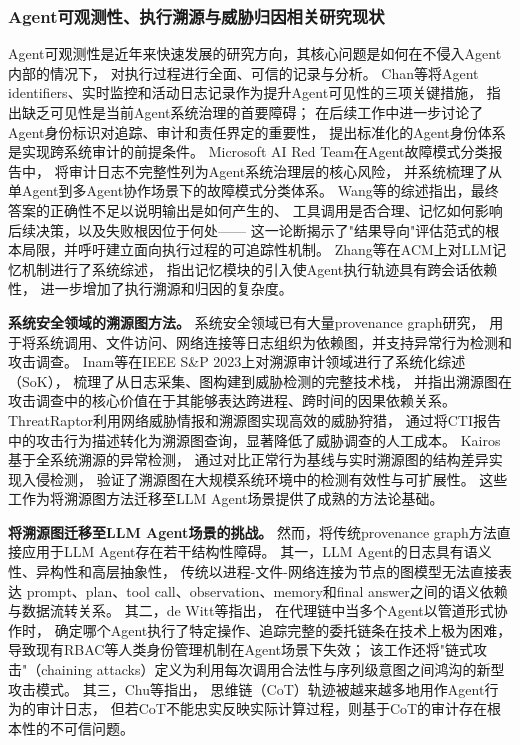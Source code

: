 \subsubsection{Agent可观测性、执行溯源与威胁归因相关研究现状}

Agent可观测性是近年来快速发展的研究方向，其核心问题是如何在不侵入Agent内部的情况下，
对执行过程进行全面、可信的记录与分析。
Chan等\cite{chan2024visibility}将Agent identifiers、实时监控和活动日志记录作为提升Agent可见性的三项关键措施，
指出缺乏可见性是当前Agent系统治理的首要障碍；
在后续工作\cite{chan2024ids}中进一步讨论了Agent身份标识对追踪、审计和责任界定的重要性，
提出标准化的Agent身份体系是实现跨系统审计的前提条件。
Microsoft AI Red Team\cite{microsoft2025taxonomy}在Agent故障模式分类报告中，
将审计日志不完整性列为Agent系统治理层的核心风险，
并系统梳理了从单Agent到多Agent协作场景下的故障模式分类体系。
Wang等\cite{wang2026traces}的综述指出，最终答案的正确性不足以说明输出是如何产生的、
工具调用是否合理、记忆如何影响后续决策，以及失败根因位于何处——
这一论断揭示了"结果导向"评估范式的根本局限，并呼吁建立面向执行过程的可追踪性机制。
Zhang等\cite{zhang2025survey}在ACM上对LLM记忆机制进行了系统综述，
指出记忆模块的引入使Agent执行轨迹具有跨会话依赖性，
进一步增加了执行溯源和归因的复杂度。

\textbf{系统安全领域的溯源图方法。}
系统安全领域已有大量provenance graph研究，
用于将系统调用、文件访问、网络连接等日志组织为依赖图，并支持异常行为检测和攻击调查。
Inam等\cite{inam2023sok}在IEEE S\&P 2023上对溯源审计领域进行了系统化综述（SoK），
梳理了从日志采集、图构建到威胁检测的完整技术栈，
并指出溯源图在攻击调查中的核心价值在于其能够表达跨进程、跨时间的因果依赖关系。
ThreatRaptor\cite{gao2021threatraptor}利用网络威胁情报和溯源图实现高效的威胁狩猎，
通过将CTI报告中的攻击行为描述转化为溯源图查询，显著降低了威胁调查的人工成本。
Kairos\cite{cheng2024kairos}基于全系统溯源的异常检测，
通过对比正常行为基线与实时溯源图的结构差异实现入侵检测，
验证了溯源图在大规模系统环境中的检测有效性与可扩展性。
这些工作为将溯源图方法迁移至LLM Agent场景提供了成熟的方法论基础。

\textbf{将溯源图迁移至LLM Agent场景的挑战。}
然而，将传统provenance graph方法直接应用于LLM Agent存在若干结构性障碍。
其一，LLM Agent的日志具有语义性、异构性和高层抽象性，
传统以进程-文件-网络连接为节点的图模型无法直接表达
prompt、plan、tool call、observation、memory和final answer之间的语义依赖与数据流转关系。
其二，de Witt等\cite{dewitt2026openchallenges}指出，
在代理链中当多个Agent以管道形式协作时，
确定哪个Agent执行了特定操作、追踪完整的委托链条在技术上极为困难，
导致现有RBAC等人类身份管理机制在Agent场景下失效；
该工作还将"链式攻击"（chaining attacks）定义为利用每次调用合法性与序列级意图之间鸿沟的新型攻击模式。
其三，Chu等\cite{chu2026systematic}指出，
思维链（CoT）轨迹被越来越多地用作Agent行为的审计日志，
但若CoT不能忠实反映实际计算过程，则基于CoT的审计存在根本性的不可信问题。

